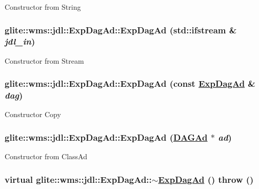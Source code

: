 Constructor from String \hypertarget{classglite_1_1wms_1_1jdl_1_1ExpDagAd_a1}{
\subsubsection[ExpDagAd]{\setlength{\rightskip}{0pt plus 5cm}glite::wms::jdl::Exp\-Dag\-Ad::Exp\-Dag\-Ad (std::ifstream \& {\em jdl\_\-in})}}
\label{classglite_1_1wms_1_1jdl_1_1ExpDagAd_a1}


Constructor from Stream \hypertarget{classglite_1_1wms_1_1jdl_1_1ExpDagAd_a2}{
\subsubsection[ExpDagAd]{\setlength{\rightskip}{0pt plus 5cm}glite::wms::jdl::Exp\-Dag\-Ad::Exp\-Dag\-Ad (const \hyperlink{classglite_1_1wms_1_1jdl_1_1ExpDagAd}{Exp\-Dag\-Ad} \& {\em dag})}}
\label{classglite_1_1wms_1_1jdl_1_1ExpDagAd_a2}


Constructor Copy \hypertarget{classglite_1_1wms_1_1jdl_1_1ExpDagAd_a3}{
\subsubsection[ExpDagAd]{\setlength{\rightskip}{0pt plus 5cm}glite::wms::jdl::Exp\-Dag\-Ad::Exp\-Dag\-Ad (\hyperlink{classglite_1_1wms_1_1jdl_1_1DAGAd}{DAGAd} $\ast$ {\em ad})}}
\label{classglite_1_1wms_1_1jdl_1_1ExpDagAd_a3}


Constructor from Class\-Ad \hypertarget{classglite_1_1wms_1_1jdl_1_1ExpDagAd_a4}{
\subsubsection[$\sim$ExpDagAd]{\setlength{\rightskip}{0pt plus 5cm}virtual glite::wms::jdl::Exp\-Dag\-Ad::$\sim$\hyperlink{classglite_1_1wms_1_1jdl_1_1ExpDagAd}{Exp\-Dag\-Ad} ()  throw ()}}
\label{classglite_1_1wms_1_1jdl_1_1ExpDagAd_a4}


